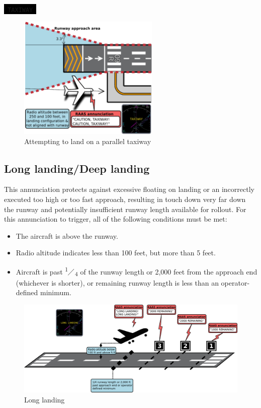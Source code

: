 \documentclass[a4paper,12pt]{article}
\newcommand{\visualadvisory}[3][b]{%
    \ifthenelse{\equal{#1}{b}}{\begin{center}}{}
    \noindent
    \colorbox{black}{\textcolor{#2visualadvisorycolor}{\large\texttt{~#3~}}}
    \ifthenelse{\equal{#1}{b}}{\end{center}}{}}
\newcommand{\myfrac}[2]{%
\textsuperscript{#1}\hspace{-0.4em}$\diagup$\hspace{-0.4em}\textsubscript{#2}}
\begin{document}
\visualadvisory{nonroutine}{TAXIWAY}

\begin{figure}[H]
\begin{center}
\includegraphics[width=0.6\textwidth]{../src/off_rwy_landing.pdf}
\end{center}
\caption{Attempting to land on a parallel taxiway}
\end{figure}

\subsection{Long landing/Deep landing}
\label{subsec:LongLandingMon}

This annunciation protects against excessive floating on landing or an
incorrectly executed too high or too fast approach, resulting in touch
down very far down the runway and potentially insufficient runway length
available for rollout. For this annunciation to trigger, all of the
following conditions must be met:

\begin{itemize}

\item The aircraft is above the runway.

\item Radio altitude indicates less than 100 feet, but more than 5 feet.

\item Aircraft is past \myfrac{1}{4} of the runway length or 2,000
feet from the approach end (whichever is shorter), or remaining runway
length is less than an operator-defined minimum.

\end{itemize}

\begin{figure}[H]
\begin{center}
\includegraphics[width=\textwidth]{../src/long_land.pdf}
\end{center}
\caption{Long landing}
\end{figure}
\end{document}
